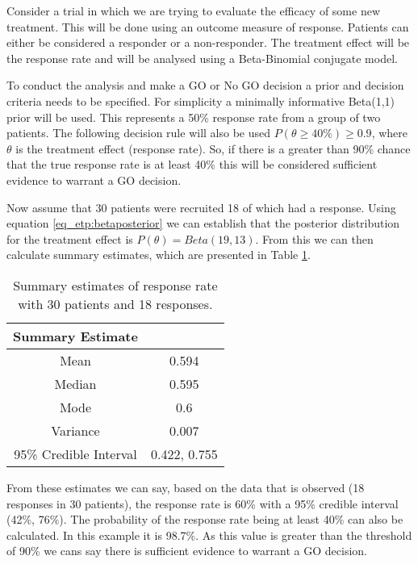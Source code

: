 Consider a trial in which we are trying to evaluate the efficacy of some new treatment. This will be done using an outcome measure of response. Patients can either be considered a responder or a non-responder. The treatment effect will be the response rate and will be analysed using a Beta-Binomial conjugate model. 

To conduct the analysis and make a GO or No GO decision a prior and decision criteria needs to be specified. For simplicity a minimally informative Beta(1,1) prior will be used. This represents a 50\% response rate from a group of two patients. The following decision rule will also be used $P(\theta  \geq 40\%) \geq 0.9$, where $\theta$ is the treatment effect (response rate). So, if there is a greater than  90\% chance that the true response rate is at least 40\% this will be considered sufficient evidence to warrant a GO decision. 

Now assume that 30 patients were recruited 18 of which had a response. Using equation \ref{eq_etp:betaposterior} we can establish that the posterior distribution for the treatment effect is $P(\theta) = Beta(19, 13)$. From this we can then calculate summary estimates, which are presented in Table \ref{tab_etp:bb_sum_est}.

\begin{table}[H]
	\centering
	\caption{Summary estimates of response rate with 30 patients and 18 responses. }
	\label{tab_etp:bb_sum_est}
	\begin{tabular}{cc}
		\hline
		\textbf{Summary Estimate}                   &              \\ \hline
		\multicolumn{1}{c|}{Mean}                   & 0.594        \\
		\multicolumn{1}{c|}{Median}                 & 0.595        \\
		\multicolumn{1}{c|}{Mode}                   & 0.6          \\
		\multicolumn{1}{c|}{Variance}               & 0.007        \\
		\multicolumn{1}{c|}{95\% Credible Interval} & 0.422, 0.755 \\ \hline
	\end{tabular}
\end{table}

From these estimates we can say, based on the data that is observed (18 responses in 30 patients), the response rate is 60\% with a 95\% credible interval (42\%, 76\%). The probability of the response rate being at least 40\% can also be calculated. In this example it is 98.7\%. As this value is greater than the threshold of 90\%  we cans say there is sufficient evidence to warrant a GO decision.

